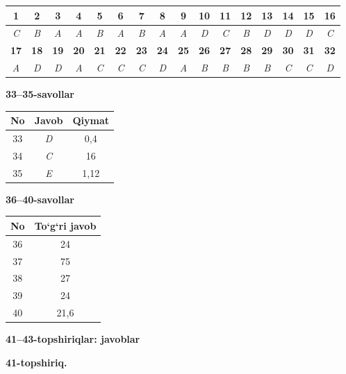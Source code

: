 \documentclass[11pt,a4paper]{article}
\begin{document}
\noindent\begin{tabular}{|c|c|c|c|c|c|c|c|c|c|c|c|c|c|c|c|}\hline
\textbf{1} & \textbf{2} & \textbf{3} & \textbf{4} & \textbf{5} & \textbf{6} & \textbf{7} & \textbf{8} & \textbf{9} & \textbf{10} & \textbf{11} & \textbf{12} & \textbf{13} & \textbf{14} & \textbf{15} & \textbf{16}\\\hline
\textsl{C} & \textsl{B} & \textsl{A} & \textsl{A} & \textsl{B} & \textsl{A} & \textsl{B} & \textsl{A} & \textsl{A} & \textsl{D} & \textsl{C} & \textsl{B} & \textsl{D} & \textsl{D} & \textsl{D} & \textsl{C}\\\hline
\textbf{17} & \textbf{18} & \textbf{19} & \textbf{20} & \textbf{21} & \textbf{22} & \textbf{23} & \textbf{24} & \textbf{25} & \textbf{26} & \textbf{27} & \textbf{28} & \textbf{29} & \textbf{30} & \textbf{31} & \textbf{32}\\\hline
\textsl{A} & \textsl{D} & \textsl{D} & \textsl{A} & \textsl{C} & \textsl{C} & \textsl{C} & \textsl{D} & \textsl{A} & \textsl{B} & \textsl{B} & \textsl{B} & \textsl{B} & \textsl{C} & \textsl{C} & \textsl{D}\\\hline
\end{tabular}\par\medskip
\noindent\textbf{33--35-savollar}\par\smallskip
\noindent\begin{tabular}{|c|c|c|}\hline \textbf{No} & \textbf{Javob} & \textbf{Qiymat}\\\hline
33 & \textsl{D} & 0,4\\\hline
34 & \textsl{C} & 16\\\hline
35 & \textsl{E} & 1,12\\\hline
\end{tabular}\par\medskip
\noindent\textbf{36--40-savollar}\par\smallskip
\noindent\begin{tabular}{|c|c|}\hline \textbf{No} & \textbf{To`g`ri javob}\\\hline
36 & 24\\\hline
37 & 75\\\hline
38 & 27\\\hline
39 & 24\\\hline
40 & 21,6\\\hline
\end{tabular}\par\medskip
\noindent\textbf{41--43-topshiriqlar: javoblar}\par\smallskip
\noindent\textbf{41-topshiriq.}\par
\end{document}
